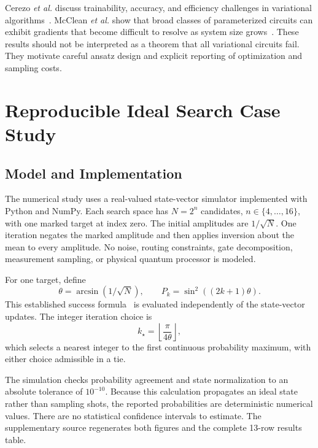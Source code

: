 \documentclass[conference]{IEEEtran}
\begin{document}
Cerezo \emph{et al.} discuss trainability, accuracy, and efficiency challenges in variational algorithms~\cite{cerezo}. McClean \emph{et al.} show that broad classes of parameterized circuits can exhibit gradients that become difficult to resolve as system size grows~\cite{mcclean}. These results should not be interpreted as a theorem that all variational circuits fail. They motivate careful ansatz design and explicit reporting of optimization and sampling costs.

\section{Reproducible Ideal Search Case Study}
\subsection{Model and Implementation}
The numerical study uses a real-valued state-vector simulator implemented with Python and NumPy. Each search space has $N=2^n$ candidates, $n\in\{4,\ldots,16\}$, with one marked target at index zero. The initial amplitudes are $1/\sqrt N$. One iteration negates the marked amplitude and then applies inversion about the mean to every amplitude. No noise, routing constraints, gate decomposition, measurement sampling, or physical quantum processor is modeled.

For one target, define
\begin{equation}
\theta=\arcsin(1/\sqrt N),\qquad
P_k=\sin^2((2k+1)\theta).
\label{eq:prob}
\end{equation}
This established success formula~\cite{boyer} is evaluated independently of the state-vector updates. The integer iteration choice is
\begin{equation}
k_\star=\left\lfloor\frac{\pi}{4\theta}\right\rfloor,
\end{equation}
which selects a nearest integer to the first continuous probability maximum, with either choice admissible in a tie.

The simulation checks probability agreement and state normalization to an absolute tolerance of $10^{-10}$. Because this calculation propagates an ideal state rather than sampling shots, the reported probabilities are deterministic numerical values. There are no statistical confidence intervals to estimate. The supplementary source regenerates both figures and the complete 13-row results table.
\end{document}
